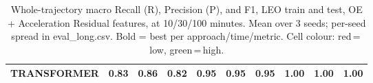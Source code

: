\begin{table}[t]
{\begin{tabular}{l ccc ccc ccc}
\textbf{TRANSFORMER} & \cellcolor[HTML]{51CF66}0.83 & \cellcolor[HTML]{51CF66}\textbf{0.86} & \cellcolor[HTML]{51CF66}0.82 & \cellcolor[HTML]{51CF66}0.95 & \cellcolor[HTML]{51CF66}0.95 & \cellcolor[HTML]{51CF66}0.95 & \cellcolor[HTML]{51CF66}\textbf{1.00} & \cellcolor[HTML]{51CF66}\textbf{1.00} & \cellcolor[HTML]{51CF66}\textbf{1.00} \\
\bottomrule
\end{tabular}%
}
\caption{Whole-trajectory macro Recall (R), Precision (P), and F1, LEO train and test, OE + Acceleration Residual features, at 10/30/100 minutes. Mean over 3 seeds; per-seed spread in eval\_long.csv. Bold = best per approach/time/metric. Cell colour: red\,=\,low, green\,=\,high.}
\label{tab:total_leo_ladder}
\end{table}
